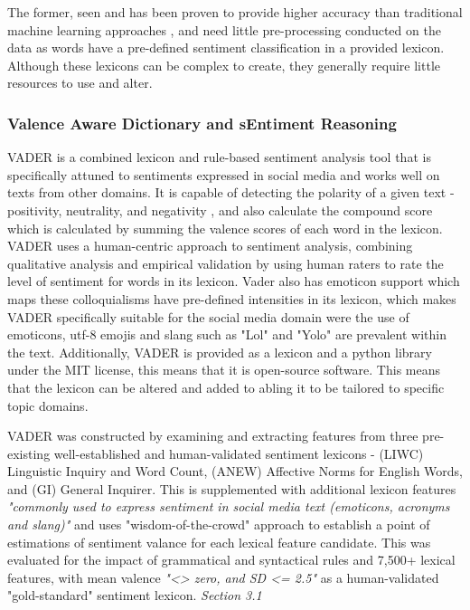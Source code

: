 \documentclass[oneside, 12pt]{article}
\begin{document}
			The former, seen and has been proven to provide higher accuracy than traditional machine learning approaches \cite{LexiconSocSent}, and need little pre-processing conducted on the data as words have a pre-defined sentiment classification in a provided lexicon. Although these lexicons can be complex to create, they generally require little resources to use and alter.
			
			\subsubsection{Valence Aware Dictionary and sEntiment Reasoning}\label{Vader}
				VADER is a combined lexicon and rule-based sentiment analysis tool that is specifically attuned to sentiments expressed in social media and works well on texts from other domains. It is capable of detecting the polarity of a given text - positivity, neutrality, and negativity \cite{VADERPaper}, and also calculate the compound score which is calculated by summing the valence scores of each word in the lexicon. VADER uses a human-centric approach to sentiment analysis, combining qualitative analysis and empirical validation by using human raters to rate the level of sentiment for words in its lexicon. Vader also has emoticon support which maps these colloquialisms have pre-defined intensities in its lexicon, which makes VADER specifically suitable for the social media domain were the use of emoticons, utf-8 emojis and slang such as "Lol" and "Yolo" are prevalent within the text. Additionally, VADER is provided as a lexicon and a python library under the MIT license, this means that it is open-source software. This means that the lexicon can be altered and added to abling it to be tailored to specific topic domains. 
				
				VADER was constructed by examining and extracting features from three pre-existing well-established and human-validated sentiment lexicons \cite{VADERPaper} - (LIWC) Linguistic Inquiry and Word Count, (ANEW) Affective Norms for English Words, and (GI) General Inquirer. This is supplemented with additional lexicon features \textit{"commonly used to express sentiment in social media text (emoticons, acronyms and slang)"} \cite{VADERPaper} and uses "wisdom-of-the-crowd" approach \cite{WisCrowds} to establish a point of estimations of sentiment valance for each lexical feature candidate. This was evaluated for the impact of grammatical and syntactical rules and 7,500+ lexical features, with mean valence \textit{"<> zero, and SD <= 2.5"} as a human-validated "gold-standard" sentiment lexicon. \cite{VADERPaper}\textit{Section 3.1}
				
\end{document}
